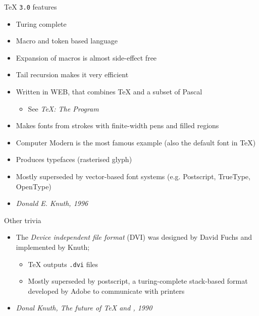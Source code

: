 \documentclass[english]{beamer}
\let\olditem\item
\renewcommand{\item}{\setlength{\itemsep}{\fill}\olditem}
\newenvironment{sitemize}{\let\item\olditem \begin{itemize}}{\vfill\end{itemize}}
\let\textttt\texttt
\renewcommand{\texttt}[1]{\colorbox{gray!10}{\textttt{#1}}}
\begin{document}
\begin{frame}{\TeX{} \texttt{3.0} features}
    \begin{itemize}
        \item Turing complete
        \item Macro and token based language
        \item Expansion of macros is almost side-effect free
        \item Tail recursion makes it very efficient
        \item Written in WEB, that combines \TeX{} and a subset of Pascal
        \begin{itemize}
            \item See \textit{\TeX: The Program}
        \end{itemize}
    \end{itemize}
\end{frame}

\begin{frame}{}
    \begin{itemize}
        \item Makes fonts from strokes with finite-width pens and filled regions
        \item Computer Modern is the most famous example {\selectfont(also the default font in \TeX{})}
        \item Produces typefaces (rasterised glyph)
        \item Mostly superseded by vector-based font systems (e.g. Postscript, TrueType, OpenType)
        \item {} \textit{Donald E. Knuth, 1996}
    \end{itemize}
\end{frame}

\begin{frame}{Other trivia}
    \begin{itemize}
        \item The \textit{Device independent file format} (DVI) was designed by David Fuchs and implemented by Knuth; 
        \begin{sitemize}
            \item \TeX{} outputs \texttt{.dvi} files
            \item Mostly superseded by postscript, a turing-complete stack-based format developed by Adobe to communicate with printers
        \end{sitemize}
        \item {} \textit{Donal Knuth, The future of \TeX{} and , 1990}
    \end{itemize}
\end{frame}
\end{document}
